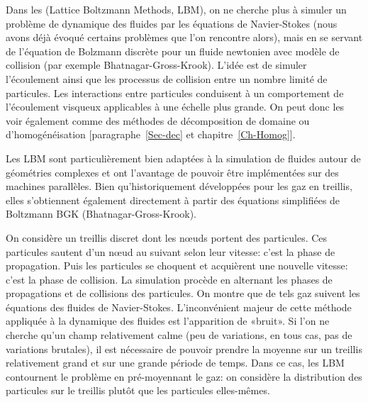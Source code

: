 \medskip
Dans les  (Lattice Boltzmann Methods, LBM), on ne cherche plus à simuler un problème de dynamique des fluides par les équations de Navier-Stokes (nous avons déjà évoqué certains problèmes que l'on rencontre alors), mais en se servant de l'équation de Bolzmann discrète pour un fluide newtonien avec modèle de collision (par exemple Bhatnagar-Gross-Krook). L'idée est de simuler l'écoulement ainsi que les processus de collision entre un nombre limité de particules. Les interactions entre particules conduisent à un comportement de l'écoulement visqueux applicables à une échelle plus grande. On peut donc les voir également comme des méthodes de décomposition de domaine ou d'homogénéisation [paragraphe~\ref{Sec-dec} et chapitre~\ref{Ch-Homog}].

\medskip
Les LBM sont particulièrement bien adaptées à la simulation de fluides autour de géométries complexes et ont l'avantage de pouvoir être implémentées sur des machines parallèles. Bien qu'historiquement développées pour les gaz en treillis, elles s'obtiennent également directement à partir des équations simplifiées de Boltzmann BGK (Bhatnagar-Gross-Krook).

On considère un treillis discret dont les nœuds portent des particules. Ces particules sautent d'un nœud au suivant selon leur vitesse: c'est la phase de propagation. Puis les particules se choquent et acquièrent une nouvelle vitesse: c'est la phase de collision. La simulation procède en alternant les phases de propagations et de collisions des particules. On montre que de tels gaz suivent les équations des fluides de Navier-Stokes. L'inconvénient majeur de cette méthode appliquée à la dynamique des fluides est l'apparition de «bruit». Si l'on ne cherche qu'un champ relativement calme (peu de variations, en tous cas, pas de variations brutales), il est nécessaire de pouvoir prendre la moyenne sur un treillis relativement grand et sur une grande période de temps. Dans ce cas, les LBM contournent le problème en pré-moyennant le gaz: on considère la distribution des particules sur le treillis plutôt que les particules elles-mêmes.

